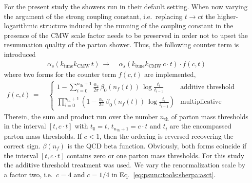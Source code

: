 For the present study the showers run in their default setting.
When now varying the argument of the strong coupling constant, i.e.\ 
replacing $t\to ct$ the higher-logarithmic structure induced by the running 
of the coupling constant in the presence of the CMW scale factor needs to be 
preserved in order not to upset the resummation quality of the parton 
shower. Thus, the following counter term is introduced
\begin{equation}
  \begin{split}\label{eq:psunc:tools:sherpa:asct}
    \alpha_s(k_\text{tune}k_\text{CMW}\,t)
    \,\to\;& \alpha_s(k_\text{tune}k_\text{CMW}\, c\cdot t)\cdot f(c,t)
  \end{split}
\end{equation}
where two forms for the counter term $f(c,t)$ are implemented,
\begin{equation}
  \begin{split}\label{eq:psunc:tools:sherpa:asctfac}
    f(c,t)
    \,=\;&\left\{\begin{array}{ll}
                  1-\sum_{i=0}^{n_\text{th}+1}\frac{\alpha_s}{2\pi}\,\beta_0(n_f(t))\,\log\frac{t_i}{t_{i-1}} & \text{additive threshold treatment}\\
                  \prod_{i=0}^{n_\text{th}+1}\left(1-\frac{\alpha_s}{2\pi}\,\beta_0(n_f(t))\,\log\frac{t_i}{t_{i-1}}\right) & \text{multiplicative threshold treatment.}
                 \end{array}\right.
  \end{split}
\end{equation}
Therein, the sum and product run over the number $n_\text{th}$ of parton mass
thresholds in the interval $[t,c\cdot t]$ with $t_0=t$,
$t_{n_\text{th}+1}=c\cdot t$ and $t_i$ are the encompassed parton mass
thresholds. If $c<1$, then the ordering is reversed recovering the correct
sign. $\beta(n_f)$ is the QCD beta function. Obviously, both forms coincide if
the interval $[t,c\cdot t]$ contains zero or one parton mass thresholds. For
this study the additive threshold treatment was used. We vary the
renormalization scale by a factor two, i.e.\ $c=4$ and $c=1/4$
in Eq.~\eqref{eq:psunc:tools:sherpa:asct}.
